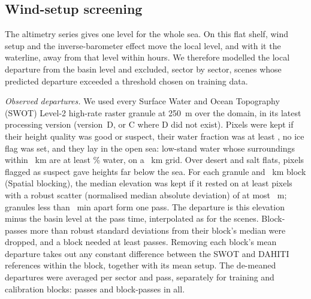 
\subsection*{Wind-setup screening}
The altimetry series gives one level for the whole sea. On this flat shelf, wind setup and the inverse-barometer effect move the local level, and with it the waterline, away from that level within hours. We therefore modelled the local departure from the basin level and excluded, sector by sector, scenes whose predicted departure exceeded a threshold chosen on training data.

\emph{Observed departures.} We used every Surface Water and Ocean Topography (SWOT) Level-2 high-rate raster granule at 250~m over the domain, in its latest processing version (version~D, or C where D did not exist)\citep{swot_raster_d,swot_raster_c,swot_pdd_raster}. Pixels were kept if their height quality was good or suspect, their water fraction was at least , no ice flag was set, and they lay in the open sea:  low-stand water whose surroundings within ~km are at least \% water, on a ~km grid. Over desert and salt flats, pixels flagged as suspect gave heights far below the sea. For each granule and ~km block (Spatial blocking), the median elevation was kept if it rested on at least  pixels with a robust scatter (normalised median absolute deviation) of at most ~m; granules less than ~min apart form one pass. The departure is this elevation minus the basin level at the pass time, interpolated as for the scenes. Block-passes more than  robust standard deviations from their block's median were dropped, and a block needed at least  passes. Removing each block's mean departure takes out any constant difference between the SWOT and DAHITI references within the block, together with its mean setup. The de-meaned departures were averaged per sector and pass, separately for training and calibration blocks:  passes and  block-passes in all.

